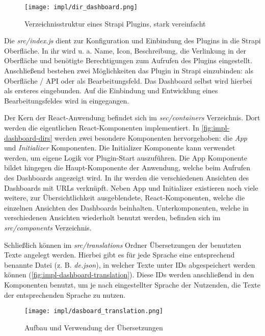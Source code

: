\begin{figure}[htpb]
    \centering
    \texttt{[image: impl/dir\_dashboard.png]}
    \caption{Verzeichnisstruktur eines Strapi Plugins, stark vereinfacht}
    \label{fig:impl-dashboard-dirs}
\end{figure}

Die \textit{src/index.js} dient zur Konfiguration und Einbindung des Plugins in
die Strapi Oberfläche. In ihr wird u. a. Name, Icon, Beschreibung, die
Verlinkung in der Oberfläche und benötigte Berechtigungen zum Aufrufen des
Plugins eingestellt. Anschließend bestehen zwei Möglichkeiten das Plugin in
Strapi einzubinden: als Oberfläche / API oder als Bearbeitungsfeld. Das
Dashboard selbst wird hierbei als ersteres eingebunden. Auf die Einbindung und
Entwicklung eines Bearbeitungsfeldes wird in
 eingegangen.

Der Kern der React-Anwendung befindet sich im \textit{sec/containers}
Verzeichnis. Dort werden die eigentlichen React-Komponenten implementiert. In
\autoref{fig:impl-dashboard-dirs} werden zwei besondere Komponenten
hervorgehoben: die \textit{App} und \textit{Initializer} Komponenten. Die
Initializer Komponente kann verwendet werden, um eigene Logik vor Plugin-Start
auszuführen. Die App Komponente bildet hingegen die Haupt-Komponente der
Anwendung, welche beim Aufrufen des Dashboards angezeigt wird. In ihr werden die
verschiedenen Ansichten des Dashboards mit URLs verknüpft. Neben App und
Initializer existieren noch viele weitere, zur Übersichtlichkeit ausgeblendete,
React-Komponenten, welche die einzelnen Ansichten des Dashboards beinhalten.
Unterkomponenten, welche in verschiedenen Ansichten wiederholt benutzt werden,
befinden sich im \textit{src/components} Verzeichnis.

Schließlich können im \textit{src/translations} Ordner Übersetzungen der
benutzten Texte angelegt werden. Hierbei gibt es für jede Sprache eine
entsprechend benannte Datei (z. B. \textit{de.json}), in welcher Texte unter IDs
abgespeichert werden können (\autoref{fig:impl-dashboard-translation}). Diese
IDs werden anschließend in den Komponenten benutzt, um je nach eingestellter
Sprache der Nutzenden, die Texte der entsprechenden Sprache zu nutzen.

\begin{figure}[htpb]
    \centering
    \texttt{[image: impl/dasboard\_translation.png]}
    \caption{Aufbau und Verwendung der Übersetzungen}
    \label{fig:impl-dashboard-translation}
\end{figure}

